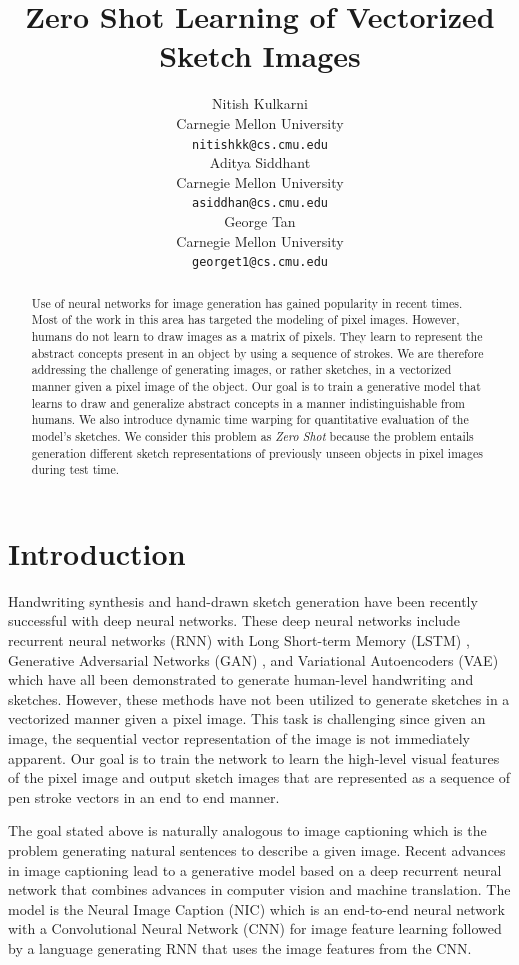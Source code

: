 \documentclass{article}
\title{Zero Shot Learning of Vectorized Sketch Images}
\author{
  Nitish Kulkarni \\
  Carnegie Mellon University\\
  \texttt{nitishkk@cs.cmu.edu} \\
  \And
  Aditya Siddhant \\
  Carnegie Mellon University\\
  \texttt{asiddhan@cs.cmu.edu} \\
  \And
  George Tan \\
  Carnegie Mellon University\\
  \texttt{georget1@cs.cmu.edu} \\
}
\begin{document}

\maketitle


\begin{abstract}
Use of neural networks for image generation has gained popularity in recent times.  Most of the work in this area has targeted the modeling of pixel images. However, humans do not learn to draw images as a matrix of pixels. They learn to represent the abstract concepts present in an object by using a sequence of strokes. We are therefore addressing the challenge of generating images, or rather sketches, in a vectorized manner given a pixel image of the object. Our goal is to train a generative model that learns to draw and generalize abstract concepts in a manner indistinguishable from humans. We also introduce dynamic time warping for quantitative evaluation of the model's sketches. We consider this problem as \textit{Zero Shot} because the problem entails generation different sketch representations of previously unseen objects in pixel images during test time.
\end{abstract}


\section{Introduction}

Handwriting synthesis and hand-drawn sketch generation have been recently successful with deep neural networks. These deep neural networks include recurrent neural networks (RNN) with Long Short-term Memory (LSTM) \cite{LSTM}, Generative Adversarial Networks (GAN) \cite{GAN}, and Variational Autoencoders (VAE) \cite{journals/corr/KingmaW13} which have all been demonstrated to generate human-level handwriting and sketches. However, these methods have not been utilized to generate sketches in a vectorized manner given a pixel image. This task is challenging since given an image, the sequential vector representation of the image is not immediately apparent. Our goal is to train the network to learn the high-level visual features of the pixel image and output sketch images that are represented as a sequence of pen stroke vectors in an end to end manner.

The goal stated above is naturally analogous to image captioning which is the problem generating natural sentences to describe a given image. Recent advances in image captioning lead to a generative model based on a deep recurrent neural network that combines advances in computer vision and machine translation. The model is the Neural Image Caption (NIC) \cite{DBLP:journals/corr/VinyalsTBE14} which is an end-to-end neural network with a Convolutional Neural Network (CNN) \cite{MNIST} for image feature learning followed by a language generating RNN that uses the image features from the CNN. 
\end{document}
